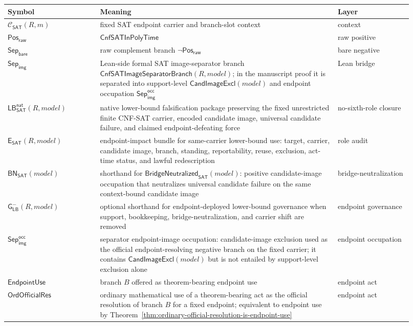 \documentclass[11pt]{article}
\theoremstyle{definition}
\theoremstyle{remark}
\newcommand{\PosRaw}{\mathsf{Pos}_{\mathsf{raw}}}
\newcommand{\SepBare}{\mathsf{Sep}_{\mathsf{bare}}}
\newcommand{\SepImg}{\mathsf{Sep}_{\mathsf{img}}}
\newcommand{\SepImgOcc}{\mathsf{Sep}_{\mathsf{img}}^{\mathsf{occ}}}
\newcommand{\CnfSATP}{\mathsf{CnfSATInPolyTime}}
\newcommand{\CnfImageSep}{\mathsf{CnfSATImageSeparatorBranch}}
\newcommand{\ClayCtx}{\mathcal{C}_{\mathsf{SAT}}(R,m)}
\newcommand{\EndpointUse}{\mathsf{EndpointUse}}
\newcommand{\CandImageExcl}{\mathsf{CandImageExcl}}
\newcommand{\OrdOfficialRes}{\mathsf{OrdOfficialRes}}
\newcommand{\LBNatSAT}{\mathsf{LB}^{\mathsf{nat}}_{\mathsf{SAT}}}
\newcommand{\EndpointImpactSAT}{\mathsf{E}_{\mathsf{SAT}}}
\newcommand{\BridgeNeutralizedSAT}{\mathsf{BridgeNeutralized}_{\mathsf{SAT}}}
\newcommand{\LowerBoundGov}{\mathsf{G}^{-}_{\mathsf{LB}}}
\begin{document}
\begin{longtable}{>{\raggedright\arraybackslash}p{0.21\linewidth}>{\raggedright\arraybackslash}p{0.54\linewidth}>{\raggedright\arraybackslash}p{0.17\linewidth}}
\toprule
Symbol & Meaning & Layer \\
\midrule
\(\ClayCtx\) & fixed SAT endpoint carrier and branch-slot context & context \\
\(\PosRaw\) & \(\CnfSATP\) & raw positive \\
\(\SepBare\) & raw complement branch \(\neg\PosRaw\) & bare negative \\
\(\SepImg\) & Lean-side formal SAT image-separator branch \(\CnfImageSep(R,model)\); in the manuscript proof it is separated into support-level \(\CandImageExcl(model)\) and endpoint occupation \(\SepImgOcc\) & Lean bridge \\
\(\LBNatSAT(R,model)\) & native lower-bound falsification package preserving the fixed unrestricted finite CNF-SAT carrier, encoded candidate image, universal candidate failure, and claimed endpoint-defeating force & no-sixth-role closure \\
\(\EndpointImpactSAT(R,model)\) & endpoint-impact bundle for same-carrier lower-bound use: target, carrier, candidate image, branch, standing, reportability, reuse, exclusion, act-time status, and lawful redescription & role audit \\
\(\mathsf{BN}_{\mathsf{SAT}}(model)\) & shorthand for \(\BridgeNeutralizedSAT(model)\): positive candidate-image occupation that neutralizes universal candidate failure on the same context-bound candidate image & bridge-neutralization \\
\(\LowerBoundGov(R,model)\) & optional shorthand for endpoint-deployed lower-bound governance when support, bookkeeping, bridge-neutralization, and carrier shift are removed & endpoint governance \\
\(\SepImgOcc\) & separator endpoint-image occupation: candidate-image exclusion used as the official endpoint-resolving negative branch on the fixed carrier; it contains \(\CandImageExcl(model)\) but is not entailed by support-level exclusion alone & endpoint occupation \\
\(\EndpointUse\) & branch \(B\) offered as theorem-bearing endpoint use & endpoint act \\
\(\OrdOfficialRes\) & ordinary mathematical use of a theorem-bearing act as the official resolution of branch \(B\) for a fixed endpoint; equivalent to endpoint use by Theorem~\ref{thm:ordinary-official-resolution-is-endpoint-use} & endpoint act \\

\end{longtable}
\end{document}
